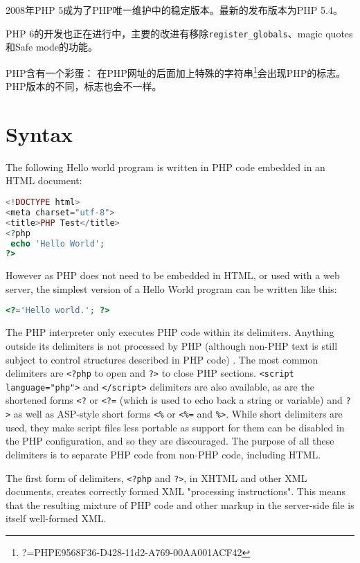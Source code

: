 2008年PHP 5成为了PHP唯一维护中的稳定版本。最新的发布版本为PHP 5.4。

PHP 6的开发也正在进行中，主要的改进有移除\texttt{register\_globals}、magic quotes和Safe mode的功能。

PHP含有一个彩蛋： 在PHP网址的后面加上特殊的字符串\footnote{?=PHPE9568F36-D428-11d2-A769-00AA001ACF42}会出现PHP的标志。PHP版本的不同，标志也会不一样。


\chapter{Syntax}

The following Hello world program is written in PHP code embedded in an HTML document:

\begin{lstlisting}[language=PHP]
<!DOCTYPE html>
<meta charset="utf-8">
<title>PHP Test</title>
<?php
 echo 'Hello World';
?>
\end{lstlisting}


However as PHP does not need to be embedded in HTML, or used with a web server, the simplest version of a Hello World program can be written like this:

\begin{lstlisting}[language=PHP]
<?='Hello world.'; ?>
\end{lstlisting}

The PHP interpreter only executes PHP code within its delimiters. Anything outside its delimiters is not processed by PHP (although non-PHP text is still subject to control structures described in PHP code) . The most common delimiters are \texttt{<?php} to open and \texttt{?>} to close PHP sections. \texttt{<script language="php">} and \texttt{</script>} delimiters are also available, as are the shortened forms \texttt{<?} or \texttt{<?=} (which is used to echo back a string or variable) and \texttt{?>} as well as ASP-style short forms \texttt{<\%} or \texttt{<\%=} and \texttt{\%>}. While short delimiters are used, they make script files less portable as support for them can be disabled in the PHP configuration, and so they are discouraged. The purpose of all these delimiters is to separate PHP code from non-PHP code, including HTML.


The first form of delimiters, \texttt{<?php} and \texttt{?>}, in XHTML and other XML documents, creates correctly formed XML "processing instructions". This means that the resulting mixture of PHP code and other markup in the server-side file is itself well-formed XML.

